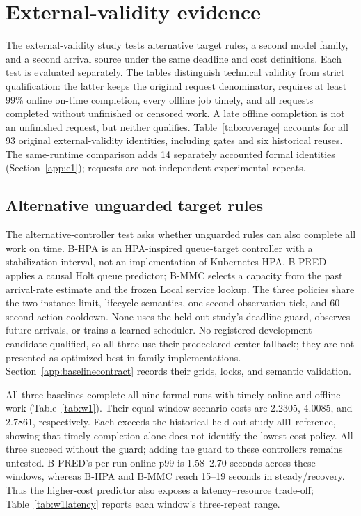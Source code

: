 \section{External-validity evidence}
\label{sec:external}
The external-validity study tests alternative target rules, a second model
family, and a second arrival source under
the same deadline and cost definitions. Each test is evaluated separately. The tables distinguish technical
validity from strict qualification: the latter keeps the original request
denominator, requires at least 99\% online on-time completion, every offline
job timely, and all requests completed without unfinished or censored work.
A late offline completion is not an unfinished request, but neither qualifies.
Table~\ref{tab:coverage} accounts for all 93 original external-validity identities, including gates
and six historical reuses. The same-runtime comparison adds 14 separately accounted formal identities
(Section~\ref{app:e1}); requests are not independent experimental repeats.

\subsection{Alternative unguarded target rules}
The alternative-controller test asks whether unguarded rules can also
complete all work on time. B-HPA is an HPA-inspired queue-target controller with a
stabilization interval, not an implementation of Kubernetes HPA. B-PRED applies a
causal Holt queue predictor; B-MMC selects a capacity from the past arrival-rate
estimate and the frozen Local service lookup. The three policies share the two-instance
limit, lifecycle semantics, one-second observation tick, and 60-second action
cooldown. None uses the held-out study's deadline guard, observes future arrivals, or trains a
learned scheduler. No registered development candidate qualified, so all three
use their predeclared center fallback; they are not presented as optimized
best-in-family implementations. Section~\ref{app:baselinecontract} records their
grids, locks, and semantic validation.

All three baselines complete all nine formal runs with timely online and offline
work (Table~\ref{tab:w1}). Their equal-window scenario costs are 2.2305, 4.0085,
and 2.7861, respectively. Each exceeds the historical held-out study all1 reference, showing that timely completion
alone does not identify the lowest-cost policy. All three succeed without the
guard; adding the guard to these controllers remains untested. B-PRED's per-run online p99 is 1.58--2.70 seconds across these windows,
whereas B-HPA and B-MMC reach 15--19 seconds in steady/recovery. Thus the
higher-cost predictor also exposes a latency--resource trade-off;
Table~\ref{tab:w1latency} reports each window's three-repeat range.

